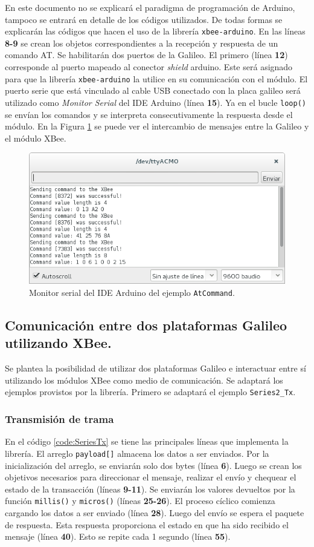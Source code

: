 \documentclass[11pt,oneside,spanish,a4paper]{article}
\begin{document}
En este documento no se explicará el paradigma de programación de
Arduino, tampoco se entrará en detalle de los códigos utilizados. De
todas formas se explicarán las códigos que hacen el uso de la librería
\texttt{xbee-arduino}. En las líneas \textbf{8-9} se crean los objetos
correspondientes a la recepción y respuesta de un comando AT. Se
habilitarán dos puertos de la Galileo. El primero (línea \textbf{12})
corresponde al puerto mapeado al conector \textsl{shield}
arduino. Este será asignado para que la librería \texttt{xbee-arduino}
la utilice en su comunicación con el módulo. El puerto serie que está
vinculado al cable USB conectado con la placa galileo será utilizado
como \emph{Monitor Serial} del IDE Arduino (línea \textbf{15}). Ya en
el bucle \texttt{loop()} se envían los comandos y se interpreta
consecutivamente la respuesta desde el módulo.  En la Figura
\ref{fig:at-cmd-consola} se puede ver el intercambio de mensajes entre
la Galileo y el módulo XBee.
\begin{figure}[h]
  \centering
  \includegraphics[width=.5\textwidth]{img/arduno-at-cmd.png}
  \caption{Monitor serial del IDE Arduino del ejemplo \texttt{AtCommand}.}
  \label{fig:at-cmd-consola}
\end{figure}

\subsection[Ejemplo \texttt{Series2\_Tx/\_Rx}]{Comunicación entre dos
  plataformas Galileo utilizando XBee.}

Se plantea la posibilidad de utilizar dos plataformas Galileo e
interactuar entre sí utilizando los módulos XBee como medio de
comunicación. Se adaptará los ejemplos provistos por la
librería. Primero se adaptará el ejemplo \texttt{Series2\_Tx}. 

\subsubsection{Transmisión de trama}

En el código \ref{code:SeriesTx} se tiene las principales líneas que
implementa la librería. El arreglo \texttt{payload[]} almacena los
datos a ser enviados. Por la inicialización del arreglo, se enviarán
solo dos bytes (línea \textbf{6}). Luego se crean los objetivos
necesarios para direccionar el mensaje, realizar el envío y chequear
el estado de la transacción (líneas \textbf{9-11}). Se enviarán los
valores devueltos por la función \texttt{millis()} y
\texttt{micros()} (líneas \textbf{25-26}). El proceso cíclico comienza
cargando los datos a ser enviado (línea \textbf{28}). Luego del envío
se espera el paquete de respuesta. Esta respuesta proporciona el
estado en que ha sido recibido el mensaje (línea \textbf{40}). Esto se
repite cada 1 segundo (línea \textbf{55}). 
\end{document}
